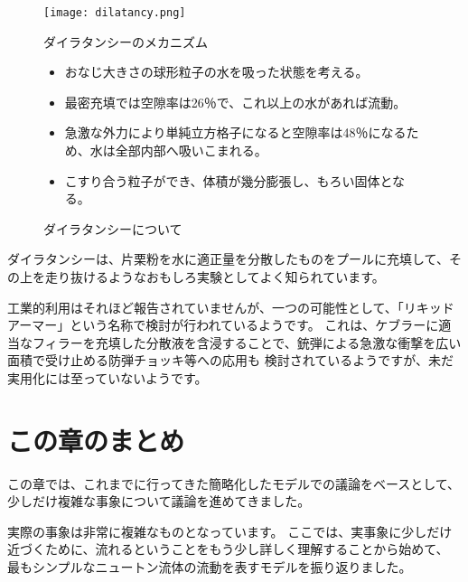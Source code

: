 \documentclass[uplatex,dvipdfmx,a4paper,11pt]{jsreport}
\begin{document}
\begin{figure}[htb]
	\begin{center}
		\begin{minipage}{0.9\textwidth}
			\begin{center}
			\texttt{[image: dilatancy.png]}
			\end{center}
		\end{minipage}
		\begin{minipage}{0.9\textwidth}
			\begin{itembox}[l]{ダイラタンシーのメカニズム}
				\begin{itemize}
					\item おなじ大きさの球形粒子の水を吸った状態を考える。
					\item 最密充填では空隙率は26％で、これ以上の水があれば流動。
					\item 急激な外力により単純立方格子になると空隙率は48％になるため、水は全部内部へ吸いこまれる。
					\item こすり合う粒子ができ、体積が幾分膨張し、もろい固体となる。
				\end{itemize}
			\end{itembox}
		\end{minipage}
		\caption{ダイラタンシーについて}
		\label{fig:dilatant}
	\end{center}
\end{figure}

ダイラタンシーは、片栗粉を水に適正量を分散したものをプールに充填して、その上を走り抜けるようなおもしろ実験としてよく知られています。

工業的利用はそれほど報告されていませんが、一つの可能性として、「リキッドアーマー」という名称で検討が行われているようです。
これは、ケブラーに適当なフィラーを充填した分散液を含浸することで、銃弾による急激な衝撃を広い面積で受け止める防弾チョッキ等への応用も
検討されているようですが、未だ実用化には至っていないようです。


\section*{この章のまとめ}

この章では、これまでに行ってきた簡略化したモデルでの議論をベースとして、少しだけ複雑な事象について議論を進めてきました。

実際の事象は非常に複雑なものとなっています。
ここでは、実事象に少しだけ近づくために、流れるということをもう少し詳しく理解することから始めて、
最もシンプルなニュートン流体の流動を表すモデルを振り返りました。
\end{document}
